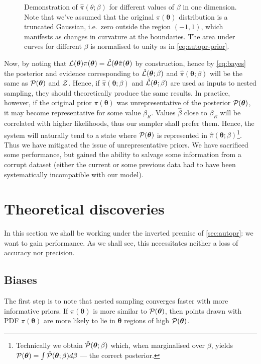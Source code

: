\documentclass[usenatbib]{mnras}
\begin{document}
\begin{figure}
 
 \caption{\label{fig:ppr} Demonstration of
   \(\hat{\pi}(\theta; \beta)\) for different values of \(\beta\) in
   one dimension. Note that we've assumed that the original
   \( \pi (\bm{\theta})\) distribution is a truncated Gaussian,
   i.e.~zero outside the region \((-1, 1)\), which manifests as
   changes in curvature at the boundaries. The area under curves for
   different $\beta$ is normalised to unity as in
   \cref{eq:autopr-prior}. }
\end{figure}

Now, by noting that
\({\cal L}(\bm{\theta})\pi (\bm{\theta}) = \hat{\cal L}(\bm{\theta}
\hat{\pi} (\bm{\theta})\) by construction, hence by \cref{eq:bayes}
the posterior and evidence corresponding to
\(\hat{\cal L}(\bm{\theta};\beta)\) and
\(\hat{\pi} (\bm{\theta};\beta)\) will be the same as
\( {\cal P} (\bm{\theta})\) and \({\cal Z}\). Hence, if
\(\hat{\pi} (\bm{\theta};\beta)\) and
\(\hat{\cal L}(\bm{\theta};\beta)\) are used as inputs to nested
sampling, they should theoretically produce the same results. In
practice, however, if the original prior \(\pi (\bm{\theta})\) was
unrepresentative of the posterior \( {\cal P} (\bm{\theta})\), it may
become representative for some value $\beta_{R}$. Values
$\hat{\beta}$ close to $\beta_{R}$ will be correlated with higher
likelihoods, thus our sampler shall prefer them. Hence, the system
will naturally tend to a state where \( {\cal P} (\bm{\theta})\) is
represented in
\(\hat{\pi} (\bm{\theta};\beta)\)\footnote{Technically we obtain
  \( \hat{\cal P} (\bm{\theta};\beta)\) which, when marginalised
  over $\beta$, yields
  \( {\cal P} (\bm{\theta}) = \int \hat{\cal P} (\bm{\theta};\beta)
  d \beta\) --- the correct posterior.}. Thus we have mitigated the
issue of unrepresentative priors. We have sacrificed some performance,
but gained the ability to salvage some information from a corrupt
dataset (either the current or some previous data had to have been
systematically incompatible with our model).


\section{Theoretical discoveries}
In this section we shall be working under the inverted premise of
\cref{sec:autopr}: we want to gain performance. As we shall see, this
necessitates neither a loss of accuracy nor precision. 

\subsection{Biases\label{discussion-bias}}
The first step is to note that nested sampling converges faster with
more informative priors. If \(\pi (\bm{\theta})\) is more similar to
\( {\cal P} (\bm{\theta})\), then points drawn with PDF
\(\pi (\bm{\theta})\) are more likely to lie in $\bm{\theta}$ regions
of high \( {\cal P} (\bm{\theta})\).
\end{document}
